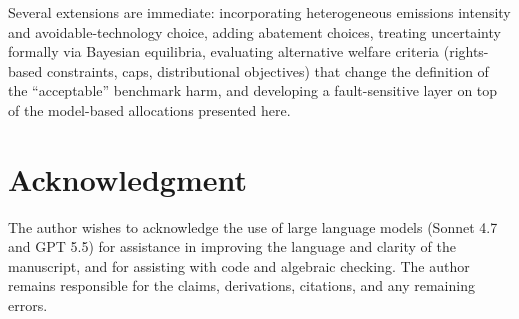 \documentclass[journal, a4paper]{IEEEtran}
\begin{document}
Several extensions are immediate: incorporating heterogeneous emissions intensity and avoidable-technology choice, adding abatement choices, treating uncertainty formally via Bayesian equilibria, evaluating alternative welfare criteria (rights-based constraints, caps, distributional objectives) that change the definition of the ``acceptable'' benchmark harm, and developing a fault-sensitive layer on top of the model-based allocations presented here.

\section*{Acknowledgment}
The author wishes to acknowledge the use of large language models (Sonnet 4.7 and GPT 5.5) for assistance in improving the language and clarity of the manuscript, and for assisting with code and algebraic checking. The author remains responsible for the claims, derivations, citations, and any remaining errors.
\end{document}
